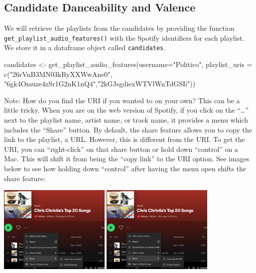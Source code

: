 \documentclass[
  letterpaper,
  DIV=11,
  numbers=noendperiod]{scrreprt}
\newenvironment{Shaded}{\begin{snugshade}}{\end{snugshade}}
\newcommand{\AttributeTok}[1]{\textcolor[rgb]{0.40,0.45,0.13}{#1}}
\newcommand{\FunctionTok}[1]{\textcolor[rgb]{0.28,0.35,0.67}{#1}}
\newcommand{\NormalTok}[1]{\textcolor[rgb]{0.00,0.23,0.31}{#1}}
\newcommand{\OtherTok}[1]{\textcolor[rgb]{0.00,0.23,0.31}{#1}}
\newcommand{\StringTok}[1]{\textcolor[rgb]{0.13,0.47,0.30}{#1}}
\begin{document}
\hypertarget{candidate-danceability-and-valence}{%
\subsection{Candidate Danceability and
Valence}\label{candidate-danceability-and-valence}}

We will retrieve the playlists from the candidates by providing the
function \texttt{get\_playlist\_audio\_features()} with the Spotify
identifiers for each playlist. We store it in a dataframe object called
\texttt{candidates}.

\begin{Shaded}
\begin{Highlighting}[]
\NormalTok{candidates }\OtherTok{\textless{}{-}} \FunctionTok{get\_playlist\_audio\_features}\NormalTok{(}\AttributeTok{username=}\StringTok{"Politico"}\NormalTok{,}
                            \AttributeTok{playlist\_uris =} \FunctionTok{c}\NormalTok{(}\StringTok{"26rVnB3MN03kRyXXWwAne0"}\NormalTok{, }\StringTok{"6gk4Omuze4zSr1G2nK1nQ4"}\NormalTok{,}\StringTok{"2kGJsgdiexWTVlWnTdGSIi"}\NormalTok{))}
\end{Highlighting}
\end{Shaded}

Note: How do you find the URI if you wanted to on your own? This can be
a little tricky. When you are on the web version of Spotify, if you
click on the ``\ldots{}'' next to the playlist name, artist name, or
track name, it provides a menu which includes the ``Share'' button. By
default, the share feature allows you to copy the link to the playlist,
a URL. However, this is different from the URI. To get the URI, you can
``right-click'' on that share button or hold down ``control'' on a Mac.
This will shift it from being the ``copy link'' to the URI option. See
images below to see how holding down ``control'' after having the menu
open shifts the share feature:

\includegraphics[width=0.4\textwidth,height=\textheight]{images/spoturl.png}
\includegraphics[width=0.4\textwidth,height=\textheight]{images/spoturi.png}
\end{document}

